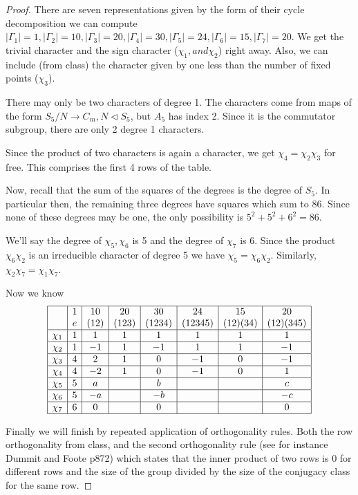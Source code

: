 \documentclass[11pt]{article}
\begin{document}
\begin{proof}
There are seven representations given by the form of their cycle decomposition we can compute $|\Gamma_1| =1 ,|\Gamma_2| =10 ,|\Gamma_3| =20 ,|\Gamma_4| =30 ,|\Gamma_5| =24 ,|\Gamma_6| =15 ,|\Gamma_7| =20 .$ We get the trivial character and the sign character ($\chi_1, and \chi_2$) right away. Also, we can include (from class) the character given by one less than the number of fixed points ($\chi_3$).


There may only be two characters of degree 1. The characters come from maps of the form $S_5 / N \to C_m, N \lhd S_5$, but $A_5$ has index 2. Since it is the commutator subgroup, there are only 2 degree 1 characters.

Since the product of two characters is again a character, we get $\chi_4=\chi_2\chi_3$ for free. This comprises the first 4 rows of the table.

Now, recall that the sum of the squares of the degrees is the degree of $S_5$. In particular then, the remaining three degrees have squares which sum to 86. Since none of these degrees may be one, the only possibility is $5^2+5^2+6^2=86.$

We'll say the degree of $\chi_5,\chi_6$ is 5 and the degree of $\chi_7$ is 6. Since the product $\chi_6 \chi_2$ is an irreducible character of degree 5 we have $\chi_5 = \chi_6 \chi_2$. Similarly,  $\chi_2 \chi_7 = \chi_1 \chi_7$.

Now we know
\[
\begin{array}{|c|c|c|c|c|c|c|c|}
\hline
&1&10&20&30&24&15&20\\
&e&(12)&(123)&(1234)&(12345)&(12)(34)&(12)(345)\\
\hline
\chi_1&1&1&1&1&1&1&1\\
\hline
\chi_2&1&-1&1&-1&1&1&-1\\
\hline
\chi_3&4&2&1&0&-1&0&-1\\
\hline
\chi_4&4&-2&1&0&-1&0&1\\
\hline
\chi_5&5&a&&b&&&c\\
\hline
\chi_6&5&-a&&-b&&&-c\\
\hline
\chi_7&6&0&&0&&&0\\
\hline
\end{array}\]

Finally we will finish by repeated application of orthogonality rules. Both the row orthogonality from class, and the second orthogonality rule (see for instance Dummit and Foote p872) which states that the inner product of two rows is 0 for different rows and the size of the group divided by the size of the conjugacy class  for the same row.


\end{proof}
\end{document}
